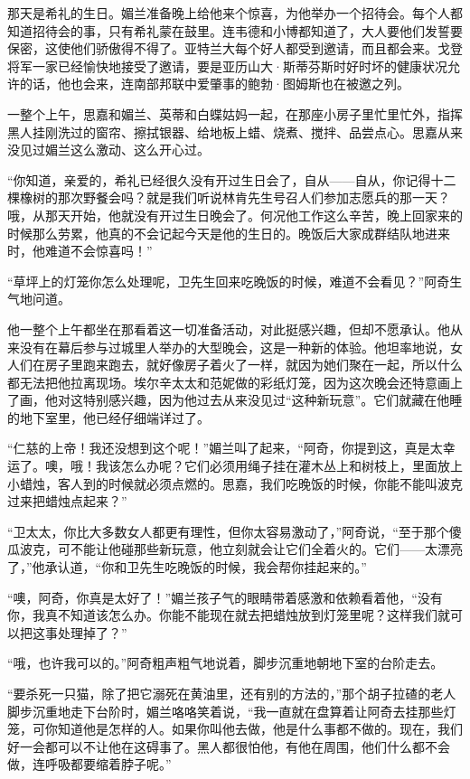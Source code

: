\par 那天是希礼的生日。媚兰准备晚上给他来个惊喜，为他举办一个招待会。每个人都知道招待会的事，只有希礼蒙在鼓里。连韦德和小博都知道了，大人要他们发誓要保密，这使他们骄傲得不得了。亚特兰大每个好人都受到邀请，而且都会来。戈登将军一家已经愉快地接受了邀请，要是亚历山大·斯蒂芬斯时好时坏的健康状况允许的话，他也会来，连南部邦联中爱肇事的鲍勃·图姆斯也在被邀之列。
\par 一整个上午，思嘉和媚兰、英蒂和白蝶姑妈一起，在那座小房子里忙里忙外，指挥黑人挂刚洗过的窗帘、擦拭银器、给地板上蜡、烧煮、搅拌、品尝点心。思嘉从来没见过媚兰这么激动、这么开心过。
\par “你知道，亲爱的，希礼已经很久没有开过生日会了，自从——自从，你记得十二棵橡树的那次野餐会吗？就是我们听说林肯先生号召人们参加志愿兵的那一天？哦，从那天开始，他就没有开过生日晚会了。何况他工作这么辛苦，晚上回家来的时候那么劳累，他真的不会记起今天是他的生日的。晚饭后大家成群结队地进来时，他难道不会惊喜吗！”
\par “草坪上的灯笼你怎么处理呢，卫先生回来吃晚饭的时候，难道不会看见？”阿奇生气地问道。
\par 他一整个上午都坐在那看着这一切准备活动，对此挺感兴趣，但却不愿承认。他从来没有在幕后参与过城里人举办的大型晚会，这是一种新的体验。他坦率地说，女人们在房子里跑来跑去，就好像房子着火了一样，就因为她们聚在一起，所以什么都无法把他拉离现场。埃尔辛太太和范妮做的彩纸灯笼，因为这次晚会还特意画上了画，他对这特别感兴趣，因为他过去从来没见过“这种新玩意”。它们就藏在他睡的地下室里，他已经仔细端详过了。
\par “仁慈的上帝！我还没想到这个呢！”媚兰叫了起来，“阿奇，你提到这，真是太幸运了。噢，哦！我该怎么办呢？它们必须用绳子挂在灌木丛上和树枝上，里面放上小蜡烛，客人到的时候就必须点燃的。思嘉，我们吃晚饭的时候，你能不能叫波克过来把蜡烛点起来？”
\par “卫太太，你比大多数女人都更有理性，但你太容易激动了，”阿奇说，“至于那个傻瓜波克，可不能让他碰那些新玩意，他立刻就会让它们全着火的。它们——太漂亮了，”他承认道，“你和卫先生吃晚饭的时候，我会帮你挂起来的。”
\par “噢，阿奇，你真是太好了！”媚兰孩子气的眼睛带着感激和依赖看着他，“没有你，我真不知道该怎么办。你能不能现在就去把蜡烛放到灯笼里呢？这样我们就可以把这事处理掉了？”
\par “哦，也许我可以的。”阿奇粗声粗气地说着，脚步沉重地朝地下室的台阶走去。
\par “要杀死一只猫，除了把它溺死在黄油里，还有别的方法的，”那个胡子拉碴的老人脚步沉重地走下台阶时，媚兰咯咯笑着说，“我一直就在盘算着让阿奇去挂那些灯笼，可你知道他是怎样的人。如果你叫他去做，他是什么事都不做的。现在，我们好一会都可以不让他在这碍事了。黑人都很怕他，有他在周围，他们什么都不会做，连呼吸都要缩着脖子呢。”
